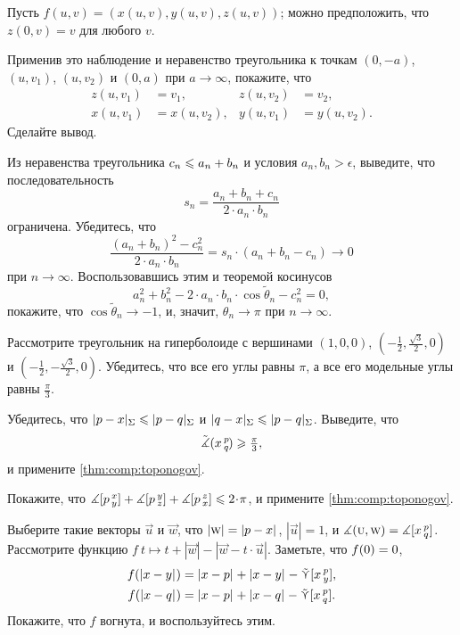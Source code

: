 \begin{multicols}{2}
Пусть $f(u,v)=(x(u,v),y(u,v),z(u,v))$;
можно предположить, что $z(0,v)=v$ для любого $v$.

Применив это наблюдение и неравенство треугольника к точкам $(0,-a)$, $(u,v_1)$, $(u,v_2)$ и $(0,a)$ при $a\to \infty$, покажите, что 
\begin{align*}
z(u,v_1)&=v_1,
&
z(u,v_2)&=v_2,
\\
x(u,v_1)&=x(u,v_2),
&
y(u,v_1)&=y(u,v_2).
\end{align*}
Сделайте вывод.



\setcounter{eqtn}{0}

Из неравенства треугольника $c_n\z\le a_n\z+b_n$ и условия $a_n,b_n>\epsilon$, выведите, что последовательность 
\[
s_n=\frac{a_n+b_n+c_n}{2\cdot a_n\cdot b_n}
\]
ограничена.
Убедитесь, что
\[
\frac{(a_n+b_n)^2-c_n^2}{2\cdot a_n\cdot b_n}=s_n\cdot (a_n+b_n-c_n)\to 0
\]
при $n\to\infty$.
Воспользовавшись этим и теоремой косинусов
\[
a_n^2+b_n^2-2\cdot a_n\cdot b_n\cdot\cos\tilde\theta_n -c_n^2=0,
\]
покажите, что $\cos\tilde\theta_n\to -1$, и, значит, $\theta_n\to \pi$ при $n\to\infty$.

Рассмотрите треугольник на гиперболоиде с вершинами $(1,0,0)$, $(-\tfrac{1}2, \tfrac{\sqrt{3}}2, 0)$ и $(-\tfrac{1}2, -\tfrac{\sqrt{3}}2, 0)$.
Убедитесь, что все его углы равны $\pi$, а все его модельные углы равны $\tfrac{\pi}3$.

Убедитесь, что $\dist{p}{x}\Sigma\le \dist{p}{q}\Sigma$ и $\dist{q}{x}\Sigma\le \dist{p}{q}\Sigma$.
Выведите, что
\[\tilde\measuredangle(x\,{}^{p}_{q}\hspace{-0.2ex})\geqslant \tfrac\pi3,\]
и примените \ref{thm:comp:toponogov}.

Покажите, что 
$\measuredangle\hinge pxy+\measuredangle\hinge pyz+\measuredangle\hinge pzx\z\le2\cdot \pi$,
и примените \ref{thm:comp:toponogov}.

Выберите такие векторы $\vec u$ и $\vec w$, что $|\vec w|\z=\dist{p}{x}{}$, $|\vec u|=1$, и $\measuredangle(\text{\sc{u}},\text{\sc{w}})=\measuredangle[x\,{}^{p}_{q}]$.
Рассмотрите функцию
$f\:t\mapsto t+|\vec w|-|\vec w-t\cdot \vec u|$.
Заметьте, что $f(0)\z=0$,
\begin{align*}
f(\dist{x}{y}{})&=\dist{x}{p}{}+\dist{x}{y}{}-\side\hinge xpy,
\\
f(\dist{x}{q}{})&=\dist{x}{p}{}+\dist{x}{q}{}-\side\hinge xpq.
\end{align*}
Покажите, что $f$ вогнута, и воспользуйтесь этим.


\end{multicols}
